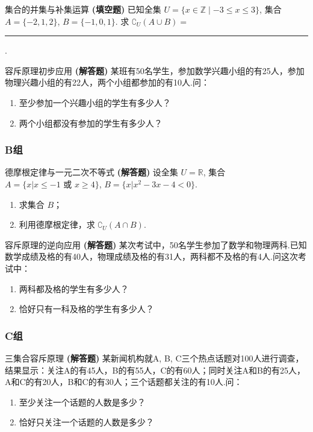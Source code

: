 \begin{exercise}{5}{集合的并集与补集运算}
	\textbf{(填空题)} 已知全集 $U=\{x \in \mathbb{Z} \mid -3 \le x \le 3\}$, 集合 $A=\{-2, 1, 2\}$, $B=\{-1, 0, 1\}$. 求 $\complement_U(A \cup B) = $ \rule{3cm}{0.5pt}.
\end{exercise}

\begin{exercise}{10}{容斥原理初步应用}
	\textbf{(解答题)} 某班有50名学生，参加数学兴趣小组的有25人，参加物理兴趣小组的有22人，两个小组都参加的有10人.问：
	\begin{enumerate}
		\item 至少参加一个兴趣小组的学生有多少人？
		\item 两个小组都没有参加的学生有多少人？
	\end{enumerate}
\end{exercise}

\subsubsection*{B组}

\begin{exercise}{12}{德摩根定律与一元二次不等式}
	\textbf{(解答题)} 设全集 $U=\mathbb{R}$, 集合 $A=\{x|x \le -1 \text{ 或 } x \ge 4\}$, $B=\{x| x^2-3x-4<0\}$.
	\begin{enumerate}
		\item 求集合 $B$；
		\item 利用德摩根定律，求 $\complement_U(A \cap B)$.
	\end{enumerate}
\end{exercise}

\begin{exercise}{12}{容斥原理的逆向应用}
	\textbf{(解答题)} 某次考试中，50名学生参加了数学和物理两科.已知数学成绩及格的有40人，物理成绩及格的有31人，两科都不及格的有4人.问这次考试中：
	\begin{enumerate}
		\item 两科都及格的学生有多少人？
		\item 恰好只有一科及格的学生有多少人？
	\end{enumerate}
\end{exercise}


\subsubsection*{C组}

\begin{exercise}{12}{三集合容斥原理}
	\textbf{(解答题)} 某新闻机构就A, B, C三个热点话题对100人进行调查，结果显示：关注A的有45人，B的有55人，C的有60人；同时关注A和B的有25人，A和C的有20人，B和C的有30人；三个话题都关注的有10人.问：
	\begin{enumerate}
		\item 至少关注一个话题的人数是多少？
		\item 恰好只关注一个话题的人数是多少？
	\end{enumerate}
\end{exercise}
